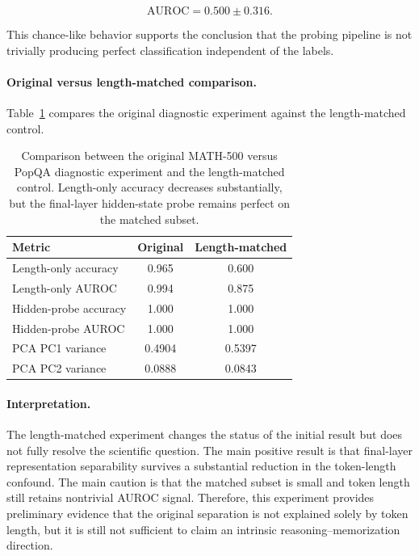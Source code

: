 \documentclass[11pt]{article}
\begin{document}
\[
\mathrm{AUROC}
=
0.500 \pm 0.316.
\]

This chance-like behavior supports the conclusion that the probing
pipeline is not trivially producing perfect classification independent
of the labels.

\paragraph{Original versus length-matched comparison.}

Table~\ref{tab:original-vs-length-matched} compares the original
diagnostic experiment against the length-matched control.

\begin{table}[H]
    \centering
    \begin{tabular}{lcc}
        \toprule
        Metric & Original & Length-matched \\
        \midrule
        Length-only accuracy & 0.965 & 0.600 \\
        Length-only AUROC & 0.994 & 0.875 \\
        Hidden-probe accuracy & 1.000 & 1.000 \\
        Hidden-probe AUROC & 1.000 & 1.000 \\
        PCA PC1 variance & 0.4904 & 0.5397 \\
        PCA PC2 variance & 0.0888 & 0.0843 \\
        \bottomrule
    \end{tabular}
    \caption{
    Comparison between the original MATH-500 versus PopQA diagnostic
    experiment and the length-matched control. Length-only accuracy
    decreases substantially, but the final-layer hidden-state probe
    remains perfect on the matched subset.
    }
    \label{tab:original-vs-length-matched}
\end{table}

\paragraph{Interpretation.}

The length-matched experiment changes the status of the initial result
but does not fully resolve the scientific question. The main positive
result is that final-layer representation separability survives a
substantial reduction in the token-length confound. The main caution
is that the matched subset is small and token length still retains
nontrivial AUROC signal. Therefore, this experiment provides
preliminary evidence that the original separation is not explained
solely by token length, but it is still not sufficient to claim an
intrinsic reasoning--memorization direction.
\end{document}

